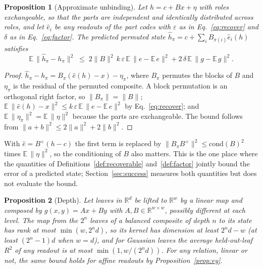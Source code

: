 \documentclass[10pt]{article}
\theoremstyle{plain}
\newtheorem{proposition}{Proposition}
\theoremstyle{remark}
\newcommand{\R}{\mathbb{R}}
\begin{document}
\begin{proposition}[Approximate unbinding]
\label{prop:approx}
Let $h = c + Bx + \eta$ with roles exchangeable, so that the parts are independent and identically distributed across roles, and let $\hat{e}_i$ be any readouts of the part codes with $\varepsilon$ as in Eq.~\eqref{eq:recover} and $\delta$ as in Eq.~\eqref{eq:factor}. The predicted permuted state $\hat{h}_\pi = c + \sum_i B_{\pi(i)}\hat{e}_i(h)$ satisfies
\begin{equation}
  \mathbb{E}\,\lVert \hat{h}_\pi - h_\pi \rVert^2 \;\le\; 2\lVert B \rVert^2\, k\,\varepsilon\, \mathbb{E}\,\lVert e - \mathbb{E}\,e \rVert^2 + 2\,\delta\, \mathbb{E}\,\lVert g - \mathbb{E}\,g \rVert^2 .
\end{equation}
\end{proposition}

\begin{proof}
$\hat{h}_\pi - h_\pi = B_\pi(\hat{e}(h) - x) - \eta_\pi$, where $B_\pi$ permutes the blocks of $B$ and $\eta_\pi$ is the residual of the permuted composite. A block permutation is an orthogonal right factor, so $\lVert B_\pi \rVert = \lVert B \rVert$; $\mathbb{E}\,\lVert \hat{e}(h) - x \rVert^2 \le k\,\varepsilon\,\mathbb{E}\,\lVert e - \mathbb{E}\,e\rVert^2$ by Eq.~\eqref{eq:recover}; and $\mathbb{E}\,\lVert \eta_\pi \rVert^2 = \mathbb{E}\,\lVert \eta \rVert^2$ because the parts are exchangeable. The bound follows from $\lVert a + b \rVert^2 \le 2\lVert a \rVert^2 + 2\lVert b \rVert^2$.
\end{proof}

\noindent
With $\hat{e} = B^{+}(h - c)$ the first term is replaced by $\lVert B_\pi B^{+} \rVert^2 \le \mathrm{cond}(B)^2$ times $\mathbb{E}\,\lVert \eta \rVert^2$, so the conditioning of $B$ also matters. This is the one place where the quantities of Definitions~\ref{def:recoverable} and~\ref{def:factor} jointly bound the error of a predicted state; Section~\ref{sec:success} measures both quantities but does not evaluate the bound.

\begin{proposition}[Depth]
\label{prop:depth}
Let leaves in $\R^d$ be lifted to $\R^w$ by a linear map and composed by $g(x, y) = Ax + By$ with $A, B \in \R^{w \times w}$, possibly different at each level. The map from the $2^n$ leaves of a balanced composite of depth $n$ to its state has rank at most $\min(w, 2^n d)$, so its kernel has dimension at least $2^n d - w$ (at least $(2^n - 1)d$ when $w = d$), and for Gaussian leaves the average held-out-leaf $R^2$ of any readout is at most $\min(1, w/(2^n d))$. For any relation, linear or not, the same bound holds for affine readouts by Proposition~\ref{prop:ey}.
\end{proposition}
\end{document}
